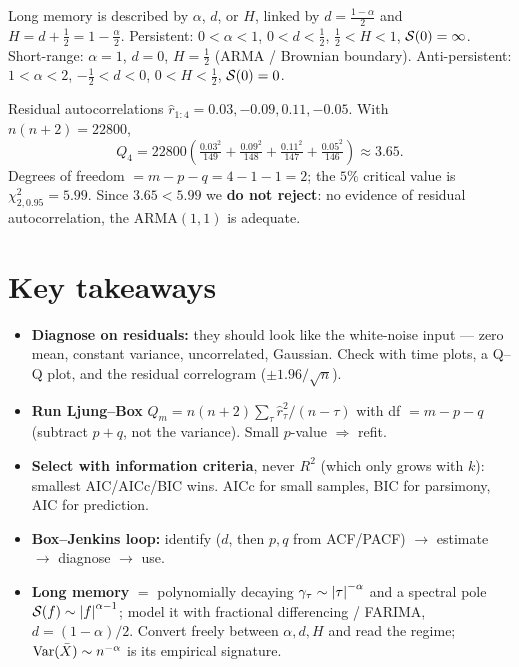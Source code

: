 \documentclass[11pt]{article}
\begin{document}
\begin{intu}
Long memory is described by $\alpha$, $d$, or $H$, linked by $d=\tfrac{1-\alpha}{2}$ and $H=d+\tfrac12=1-\tfrac{\alpha}{2}$. Persistent: $0<\alpha<1$, $0<d<\tfrac12$, $\tfrac12<H<1$, $\mathcal{S}(0)=\infty$. Short-range: $\alpha=1$, $d=0$, $H=\tfrac12$ (ARMA / Brownian boundary). Anti-persistent: $1<\alpha<2$, $-\tfrac12<d<0$, $0<H<\tfrac12$, $\mathcal{S}(0)=0$.
\end{intu}

\begin{exmpl}[Ljung--Box test, $n=150$, ARMA$(1,1)$]
Residual autocorrelations $\hat r_{1:4}=0.03,-0.09,0.11,-0.05$. With $n(n+2)=22800$,
\[
Q_4 = 22800\!\left(\tfrac{0.03^2}{149}+\tfrac{0.09^2}{148}+\tfrac{0.11^2}{147}+\tfrac{0.05^2}{146}\right)\approx 3.65.
\]
Degrees of freedom $=m-p-q=4-1-1=2$; the $5\%$ critical value is $\chi^2_{2,0.95}=5.99$. Since $3.65<5.99$ we \textbf{do not reject}: no evidence of residual autocorrelation, the ARMA$(1,1)$ is adequate.
\end{exmpl}

\section*{Key takeaways}

\begin{retenir}
\begin{itemize}
  \item \textbf{Diagnose on residuals:} they should look like the white-noise input --- zero mean, constant variance, uncorrelated, Gaussian. Check with time plots, a Q--Q plot, and the residual correlogram ($\pm1.96/\sqrt n$).
  \item \textbf{Run Ljung--Box} $Q_m=n(n+2)\sum_\tau \hat r_\tau^2/(n-\tau)$ with df $=m-p-q$ (subtract $p+q$, not the variance). Small $p$-value $\Rightarrow$ refit.
  \item \textbf{Select with information criteria}, never $R^2$ (which only grows with $k$): smallest AIC/AICc/BIC wins. AICc for small samples, BIC for parsimony, AIC for prediction.
  \item \textbf{Box--Jenkins loop:} identify ($d$, then $p,q$ from ACF/PACF) $\to$ estimate $\to$ diagnose $\to$ use.
  \item \textbf{Long memory} $=$ polynomially decaying $\gamma_\tau\sim\left\lvert \tau \right\rvert^{-\alpha}$ and a spectral pole $\mathcal{S}(f)\sim\left\lvert f \right\rvert^{\alpha-1}$; model it with fractional differencing / FARIMA, $d=(1-\alpha)/2$. Convert freely between $\alpha,d,H$ and read the regime; $\operatorname{Var}(\bar X)\sim n^{-\alpha}$ is its empirical signature.
\end{itemize}
\end{retenir}
\end{document}
